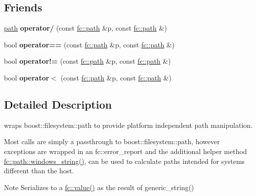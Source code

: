\subsection*{Friends}
\begin{DoxyCompactItemize}
\item 
\mbox{\label{classfc_1_1path_af45dc6cd4ecfc8ca7d0d76fa394e7c3d}} 
\mbox{\hyperlink{classfc_1_1path}{path}} {\bfseries operator/} (const \mbox{\hyperlink{classfc_1_1path}{fc\+::path}} \&p, const \mbox{\hyperlink{classfc_1_1path}{fc\+::path}} \&)
\item 
\mbox{\label{classfc_1_1path_afd02e7ea89cb6a2b81d8bc4369e9636b}} 
bool {\bfseries operator==} (const \mbox{\hyperlink{classfc_1_1path}{fc\+::path}} \&p, const \mbox{\hyperlink{classfc_1_1path}{fc\+::path}} \&)
\item 
\mbox{\label{classfc_1_1path_a8f32b11a97d3c20600c24dc2d0f31643}} 
bool {\bfseries operator!=} (const \mbox{\hyperlink{classfc_1_1path}{fc\+::path}} \&p, const \mbox{\hyperlink{classfc_1_1path}{fc\+::path}} \&)
\item 
\mbox{\label{classfc_1_1path_ad90b5a13641f4566ff587ee41dc964a8}} 
bool {\bfseries operator$<$} (const \mbox{\hyperlink{classfc_1_1path}{fc\+::path}} \&p, const \mbox{\hyperlink{classfc_1_1path}{fc\+::path}} \&)
\end{DoxyCompactItemize}


\subsection{Detailed Description}
wraps boost\+::filesystem\+::path to provide platform independent path manipulation. 

Most calls are simply a passthrough to boost\+::filesystem\+::path, however exceptions are wrapped in an fc\+::error\+\_\+report and the additional helper method \mbox{\hyperlink{classfc_1_1path_a12a75eca015d0c9880e2c062e371d08d}{fc\+::path\+::windows\+\_\+string()}}, can be used to calculate paths intended for systems different than the host.

\begin{DoxyNote}{Note}
Serializes to a \mbox{\hyperlink{namespacewebsocketpp_1_1close_1_1status_a8614a5c4733d708e2d2a32191c5bef84}{fc\+::value()}} as the result of generic\+\_\+string() 
\end{DoxyNote}


